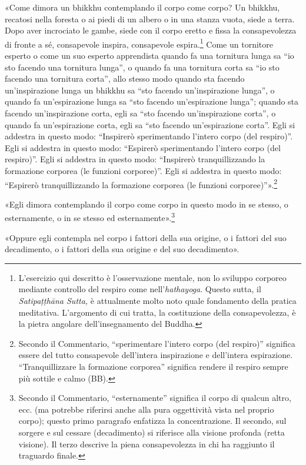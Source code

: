 «Come dimora un bhikkhu contemplando il corpo come corpo? Un bhikkhu,
recatosi nella foresta o ai piedi di un albero o in una stanza vuota,
siede a terra. Dopo aver incrociato le gambe, siede con il corpo eretto
e fissa la consapevolezza di fronte a sé, consapevole inspira,
consapevole espira.\footnote{L’esercizio qui descritto è l’osservazione mentale, non lo sviluppo corporeo mediante controllo del respiro come nell’\emph{hathayoga}. Questo sutta, il \emph{Satipaṭṭhāna Sutta,} è attualmente molto noto quale fondamento della pratica meditativa. L’argomento di cui tratta, la costituzione della consapevolezza, è la pietra angolare dell’insegnamento del Buddha.} Come un tornitore esperto o come
un suo esperto apprendista quando fa una tornitura lunga sa “io sto
facendo una tornitura lunga”, o quando fa una tornitura corta sa “io sto
facendo una tornitura corta”, allo stesso modo quando sta facendo
un’inspirazione lunga un bhikkhu sa “sto facendo un’inspirazione lunga”,
o quando fa un’espirazione lunga sa “sto facendo un’espirazione lunga”;
quando sta facendo un’inspirazione corta, egli sa “sto facendo
un’inspirazione corta”, o quando fa un’espirazione corta, egli sa “sto
facendo un’espirazione corta”. Egli si addestra in questo modo:
“Inspirerò sperimentando l’intero corpo (del respiro)”. Egli si addestra
in questo modo: “Espirerò sperimentando l’intero corpo (del respiro)”.
Egli si addestra in questo modo: “Inspirerò tranquillizzando la
formazione corporea (le funzioni corporee)”. Egli si addestra in questo
modo: “Espirerò tranquillizzando la formazione corporea (le funzioni
corporee)”».\footnote{Secondo il Commentario, “sperimentare l’intero corpo (del respiro)” significa essere del tutto consapevole dell’intera inspirazione e dell’intera espirazione. “Tranquillizzare la formazione corporea” significa rendere il respiro sempre più sottile e calmo (BB).}


«Egli dimora contemplando il corpo come corpo in questo modo in se
stesso, o esternamente, o in se stesso ed
esternamente».\footnote{Secondo il Commentario, “esternamente” significa il corpo di qualcun altro, ecc. (ma potrebbe riferirsi anche alla pura oggettività vista nel proprio corpo); questo primo paragrafo enfatizza la concentrazione. Il secondo, sul sorgere e sul cessare (decadimento) si riferisce alla visione profonda (retta visione). Il terzo descrive la piena consapevolezza in chi ha raggiunto il traguardo finale.}


«Oppure egli contempla nel corpo i fattori della sua origine, o i
fattori del suo decadimento, o i fattori della sua origine e del suo
decadimento».


